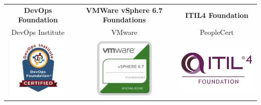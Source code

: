 \documentclass[9pt]{developercv} %
\newif\ifen
\newif\ifes
\newcommand{\en}[1]{\ifen#1\fi}
\newcommand{\es}[1]{\ifes#1\fi}
\begin{document}
\cvsect{
  \es{Certificaciones oficiales}
  \en{Official certifications}
}

\setlength{\tabcolsep}{12pt}
\begin{tabular}{ccc}
  \textbf{DevOps Foundation} & \textbf{VMWare vSphere 6.7 Foundations} & \textbf{ITIL4 Foundation} \\
  DevOps Institute & VMware & PeopleCert \\
  \includegraphics[height=3cm]{img/cert_devops.jpg} &
  \includegraphics[height=3cm]{img/cert_vmware-foundations.png} &
  \includegraphics[height=3cm]{img/cert_itil4-foundation.png}
\end{tabular}\\

\end{document}
